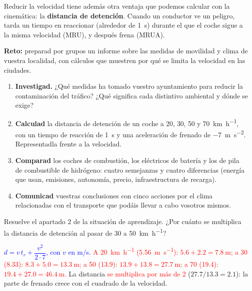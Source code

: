 Reducir la velocidad tiene además otra ventaja que podemos calcular con la cinemática: la \textbf{distancia de detención}. Cuando un
conductor ve un peligro, tarda un tiempo en reaccionar (alrededor de \qty{1}{\s}) durante el que el coche sigue a la misma velocidad
(MRU), y después frena (MRUA).

\begin{marker}
    \textbf{Reto:} preparad por grupos un informe sobre las medidas de movilidad y clima de vuestra localidad, con cálculos que
    muestren por qué se limita la velocidad en las ciudades.
\end{marker}

\begin{enumerate}[label=\numberballred]
    \item \textbf{Investigad.} ¿Qué medidas ha tomado vuestro ayuntamiento para reducir la contaminación del tráfico? ¿Qué significa
    cada distintivo ambiental y dónde se exige?
    \item \textbf{Calculad} la distancia de detención de un coche a 20, 30, 50 y \qty{70}{\km\per\hour}, con un tiempo de reacción de
    \qty{1}{\s} y una aceleración de frenado de \qty{-7}{\m\per\s\squared}. Representadla frente a la velocidad.
    \item \textbf{Comparad} los coches de combustión, los eléctricos de batería y los de pila de combustible de hidrógeno: cuatro
    semejanzas y cuatro diferencias (energía que usan, emisiones, autonomía, precio, infraestructura de recarga).
    \item \textbf{Comunicad} vuestras conclusiones con cinco acciones por el clima relacionadas con el transporte que podáis llevar a
    cabo vosotros mismos.
\end{enumerate}

\begin{exercise}
    Resuelve el apartado 2 de la situación de aprendizaje. ¿Por cuánto se multiplica la distancia de detención al pasar de 30 a
    \qty{50}{\km\per\hour}?
    \begin{solu}
        \textcolor{blue}{\(d = v\,t_r + \dfrac{v^2}{2 \cdot 7}\), con \(v\) en m/s.} \textcolor{red}{A \qty{20}{\km\per\hour}
        (\qty{5.56}{\m\per\s}): \(\num{5.6} + \num{2.2} = \qty{7.8}{\m}\); a 30 (\num{8.33}): \(\num{8.3} + \num{5.0} =
        \qty{13.3}{\m}\); a 50 (\num{13.9}): \(\num{13.9} + \num{13.8} = \qty{27.7}{\m}\); a 70 (\num{19.4}): \(\num{19.4} +
        \num{27.0} = \qty{46.4}{\m}\).} La distancia \textcolor{red}{se multiplica por más de 2} (\(\num{27.7}/\num{13.3} =
        \num{2.1}\)): la parte de frenado crece con el cuadrado de la velocidad.
    \end{solu}
\end{exercise}
